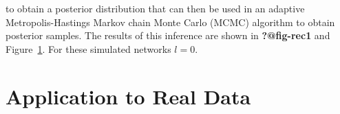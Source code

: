\documentclass[
  sn-basic,
]{sn-jnl}
\theoremstyle{plain}
\theoremstyle{remark}
\begin{document}
to obtain a posterior distribution that can then be used in an adaptive
Metropolis-Hastings Markov chain Monte Carlo (MCMC) algorithm to obtain
posterior samples. The results of this inference are shown in
\textbf{?@fig-rec1} and Figure~\ref{fig-rec2}. For these simulated
networks \(l=0\).

\begin{figure}[H]


\caption{\label{fig-rec2}}

\end{figure}%

\section{Application to Real Data}\label{application-to-real-data}
\end{document}
